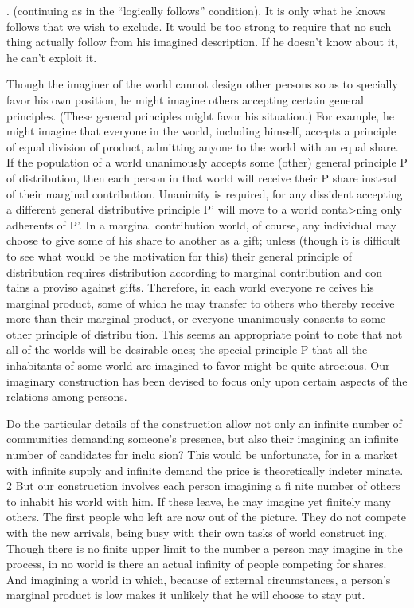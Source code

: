 \documentclass[11pt,openany]{book}
\begin{document}
. (continuing as in the ``logically follows'' condition). It is only what he knows follows that we wish to exclude. It would be too strong to require that no such thing actually follow from his imagined description. If he doesn't know about it, he can't exploit it. 

Though the imaginer of the world cannot design other persons so as to specially favor his own position, he might imagine others accepting certain general principles. (These general principles might favor his situation.) For example, he might imagine that everyone in the world, including himself, accepts a principle of equal division of product, admitting anyone to the world with an equal share. If the population of a world unanimously accepts some (other) general principle P of distribution, then each person in that world will receive their P share instead of their marginal contribution. Unanimity is required, for any dissident accepting a different general distributive principle P' will move to a world conta>ning only adherents of P'. In a marginal contribution world, of course, any individual may choose to give some of his share to another as a gift; unless (though it is difficult to see what would be the motivation for this) their general principle of distribution requires distribution according to marginal contribution and con tains a proviso against gifts. Therefore, in each world everyone re ceives his marginal product, some of which he may transfer to others who thereby receive more than their marginal product, or everyone unanimously consents to some other principle of distribu tion. This seems an appropriate point to note that not all of the worlds will be desirable ones; the special principle P that all the inhabitants of some world are imagined to favor might be quite atrocious. Our imaginary construction has been devised to focus only upon certain aspects of the relations among persons. 

Do the particular details of the construction allow not only an infinite number of communities demanding someone's presence, but also their imagining an infinite number of candidates for inclu sion? This would be unfortunate, for in a market with infinite supply and infinite demand the price is theoretically indeter minate. 2 But our construction involves each person imagining a fi nite number of others to inhabit his world with him. If these leave, he may imagine yet finitely many others. The first people who left are now out of the picture. They do not compete with the new arrivals, being busy with their own tasks of world construct ing. Though there is no finite upper limit to the number a person may imagine in the process, in no world is there an actual infinity of people competing for shares. And imagining a world in which, because of external circumstances, a person's marginal product is low makes it unlikely that he will choose to stay put. 
\end{document}
